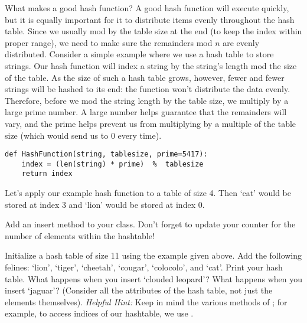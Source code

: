 What makes a good hash function?
A good hash function will execute quickly, but it is equally important for it to distribute items evenly throughout the hash table. 
Since we usually mod by the table size at the end (to keep the index within proper range), we need to make sure the remainders mod $n$ are evenly distributed.
Consider a simple example where we use a hash table to store strings.
Our hash function will index a string by the string's length mod the size of the table.
As the size of such a hash table grows, however,  fewer and fewer strings will be hashed to its end: the function won't distribute the data evenly.
Therefore, before we mod the string length by the table size, we multiply by a large prime number.
A large number helps guarantee that the remainders will vary, and the prime helps prevent us from multiplying by a multiple of the table size (which would send us to $0$ every time).
\begin{lstlisting}
def HashFunction(string, tablesize, prime=5417):
    index = (len(string) * prime)  %  tablesize
    return index
\end{lstlisting}
Let's apply our example hash function to a table of size 4.
Then `cat' would be stored at index $3$ and `lion' would be stored at index $0$.
\begin{figure}
\end{figure}
\begin{problem}
Add an insert method to your  class. Don't forget to update your counter for the number of elements within the hashtable!

Initialize a hash table of size 11 using the example  given above.
Add the following felines: `lion', `tiger', `cheetah', `cougar', `colocolo', and `cat'.
Print your hash table. What happens when you insert `clouded leopard'?
What happens when you insert `jaguar'? (Consider all the attributes of the hash table, not just the elements themselves).
\emph{Helpful Hint:} Keep in mind the various methods of ; for example, to access indices of our hashtable, we use .
\label{Prob:Basic hash insert}
\end{problem}

